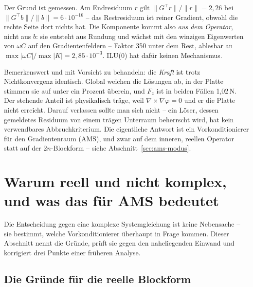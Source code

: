 \documentclass[11pt,a4paper]{article}
\begin{document}
Der Grund ist gemessen. Am Endresiduum $r$ gilt $\|G^{\!\top}r\|/\|r\| = 2{,}26$
bei $\|G^{\!\top}b\|/\|b\| = 6\cdot10^{-16}$ -- das Restresiduum ist reiner
Gradient, obwohl die rechte Seite dort nichts hat. Die Komponente kommt also
\emph{aus dem Operator}, nicht aus $b$: sie entsteht aus Rundung und wächst mit
den winzigen Eigenwerten von $\omega C$ auf den Gradientenfeldern -- Faktor 350
unter dem Rest, ablesbar an $\max|\omega C|/\max|K| = 2{,}85\cdot10^{-3}$.
ILU(0) hat dafür keinen Mechanismus.

Bemerkenswert und mit Vorsicht zu behandeln: die \emph{Kraft} ist trotz
Nichtkonvergenz identisch. Global weichen die Lösungen ab, in der Platte
stimmen sie auf unter ein Prozent überein, und $F_z$ ist in beiden Fällen
1,02\,N. Der stehende Anteil ist physikalisch träge, weil
$\nabla\times\nabla\varphi = 0$ und er die Platte nicht erreicht. Darauf
verlassen sollte man sich nicht -- ein Löser, dessen gemeldetes Residuum von
einem trägen Unterraum beherrscht wird, hat kein verwendbares
Abbruchkriterium. Die eigentliche Antwort ist ein Vorkonditionierer für den
Gradientenraum (AMS), und zwar auf dem inneren, reellen Operator statt auf der
$2n$-Blockform -- siehe Abschnitt~\ref{sec:ams-modus}.


\section{Warum reell und nicht komplex, und was das für AMS bedeutet}
\label{sec:ams}

Die Entscheidung gegen eine komplexe Systemgleichung ist keine Nebensache --
sie bestimmt, welche Vorkonditionierer überhaupt in Frage kommen. Dieser
Abschnitt nennt die Gründe, prüft sie gegen den naheliegenden Einwand und
korrigiert drei Punkte einer früheren Analyse.

\subsection{Die Gründe für die reelle Blockform}
\end{document}

